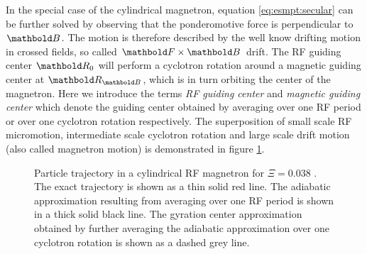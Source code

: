 In the special case of the cylindrical magnetron, equation
\eqref{eq:esmpt:secular} can be further solved by observing
that the ponderomotive force is perpendicular to $\mb B$.
The motion is therefore described by the well know drifting
motion in crossed fields, so called $\mb F\times\mb B$ drift.
The \ac{RF} guiding center $\mb R_0$
will perform a cyclotron rotation around a magnetic guiding
center at $\mb R_{\mb B}$, which is in turn orbiting the center
of the magnetron. Here we introduce the terms {\em RF
guiding center} and {\em magnetic guiding center} which
denote the guiding center obtained by averaging over one \ac{RF}
period or over one cyclotron rotation respectively.
The superposition of small scale \ac{RF} micromotion,
intermediate scale cyclotron rotation and large scale drift
motion (also called magnetron motion) is demonstrated in figure
\ref{fig:esmpt:traj}.

\begin{figure}
\caption{Particle trajectory in a cylindrical \ac{RF} magnetron
for $\Xi= 0.038$%
.
The exact trajectory is shown as a thin solid red line. The
adiabatic approximation resulting from averaging over one
\ac{RF} period is shown in a thick solid black line. The gyration
center approximation obtained by further averaging the
adiabatic approximation over one cyclotron rotation is shown
as a dashed grey line.}
\label{fig:esmpt:traj}
\end{figure}


